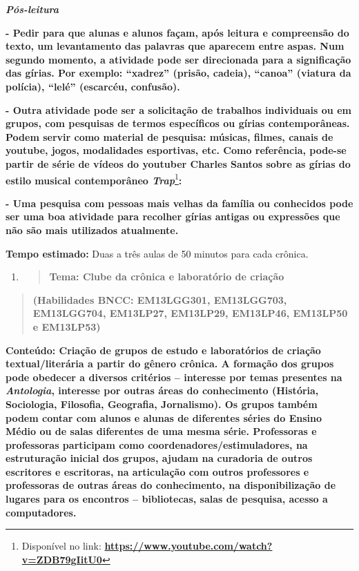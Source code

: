 \emph{\textbf{Pós-leitura}}

\textbf{- Pedir para que alunas e alunos façam, após leitura e
compreensão do texto, um levantamento das palavras que aparecem entre
aspas. Num segundo momento, a atividade pode ser direcionada para a
significação das gírias. Por exemplo: ``xadrez'' (prisão, cadeia),
``canoa'' (viatura da polícia), ``lelé'' (escarcéu, confusão).}

\textbf{- Outra atividade pode ser a solicitação de trabalhos
individuais ou em grupos, com pesquisas de termos específicos ou gírias
contemporâneas. Podem servir como material de pesquisa: músicas, filmes,
canais de youtube, jogos, modalidades esportivas, etc. Como referência,
pode-se partir de série de vídeos do youtuber Charles Santos sobre as
gírias do estilo musical contemporâneo \emph{Trap}}\footnote{Disponível
  no link: \textbf{\url{https://www.youtube.com/watch?v=ZDB79gIitU0} }}\textbf{:}

\textbf{- Uma pesquisa com pessoas mais velhas da família ou conhecidos
pode ser uma boa atividade para recolher gírias antigas ou expressões
que não são mais utilizados atualmente. }

\textbf{Tempo estimado:} Duas a três aulas de 50 minutos para cada
crônica.

\begin{enumerate}
\def\labelenumi{\arabic{enumi})}
\setcounter{enumi}{2}
\item
  \begin{quote}
  \textbf{Tema: Clube da crônica e laboratório de criação}
  \end{quote}
\end{enumerate}

\begin{quote}
\textbf{(Habilidades BNCC: EM13LGG301, EM13LGG703, EM13LGG704, EM13LP27,
EM13LP29, EM13LP46, EM13LP50 e EM13LP53)}
\end{quote}

\textbf{Conteúdo: Criação de grupos de estudo e laboratórios de criação
textual/literária a partir do gênero crônica. A formação dos grupos pode
obedecer a diversos critérios -- interesse por temas presentes na
\emph{Antologia}, interesse por outras áreas do conhecimento (História,
Sociologia, Filosofia, Geografia, Jornalismo). Os grupos também podem
contar com alunos e alunas de diferentes séries do Ensino Médio ou de
salas diferentes de uma mesma série. Professoras e professoras
participam como coordenadores/estimuladores, na estruturação inicial dos
grupos, ajudam na curadoria de outros escritores e escritoras, na
articulação com outros professores e professoras de outras áreas do
conhecimento, na disponibilização de lugares para os encontros --
bibliotecas, salas de pesquisa, acesso a computadores.}

